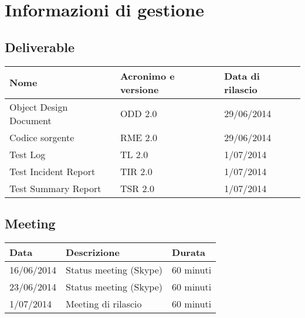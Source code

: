 \chapter{Informazioni di gestione}
\section{Deliverable}

\begin{table}[ht]
  \centering
  \begin{tabular}{|p{5cm}|p{3cm}|p{4cm}|}
    \hline
    \rowcolor{Gray}\textbf{Nome}	& \textbf{Acronimo e versione}			& \textbf{Data di rilascio}\\
    \hline
    Object Design Document		& ODD 2.0					& 29/06/2014		   \\
    \hline
    Codice sorgente			& RME 2.0					& 29/06/2014		   \\
    \hline
    Test Log				& TL 2.0					& 1/07/2014		   \\
    \hline
    Test Incident Report		& TIR 2.0					& 1/07/2014		   \\
    \hline
    Test Summary Report			& TSR 2.0					& 1/07/2014		   \\
    \hline
  \end{tabular}
\end{table}

\section{Meeting}

\begin{table}[ht]
  \centering
  \begin{tabular}{|p{3cm}|p{5cm}|p{3cm}|}
  \hline
  \rowcolor{Gray}\textbf{Data}		& \textbf{Descrizione}			& \textbf{Durata}			\\
  \hline
  16/06/2014				& Status meeting (Skype)		& 60 minuti				\\
  \hline
  23/06/2014				& Status meeting (Skype)		& 60 minuti				\\
  \hline
  1/07/2014				& Meeting di rilascio			& 60 minuti				\\
  \hline
  \end{tabular}
\end{table}
